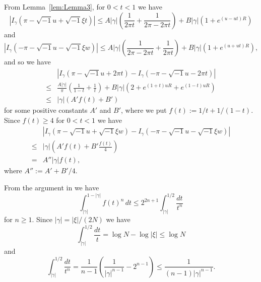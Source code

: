 \documentclass[a4paper]{amsart}
\theoremstyle{plain}
\theoremstyle{definition}
\theoremstyle{remark}
\numberwithin{equation}{section}
\begin{document}
From Lemma~\ref{lem:Lemma3}, for $0<t<1$ we have
\begin{equation*}
  \left|
    I_{\gamma}(\pi-\sqrt{-1}u+\sqrt{-1}\xi t)
  \right|
  \le
  A|\gamma|
  \left(
    \frac{1}{2\pi t}+\frac{1}{2\pi-2\pi t}
  \right)
  +
  B|\gamma|
  \left(
    1+e^{(u-ut)R}
  \right)
\end{equation*}
and
\begin{equation*}
  \left|
    I_{\gamma}(-\pi-\sqrt{-1}u-\sqrt{-1}\xi w)
  \right|
  \le
  A|\gamma|
  \left(
    \frac{1}{2\pi-2\pi t}+\frac{1}{2\pi t}
  \right)
  +
  B|\gamma|
  \left(
    1+e^{(u+ut)R}
  \right),
\end{equation*}
and so we have
\begin{equation*}
\begin{split}
  &\left|
    I_{\gamma}(\pi-\sqrt{-1}u+2\pi t)
    -
    I_{\gamma}(-\pi-\sqrt{-1}u-2\pi t)
  \right|
  \\
  \le&
  \frac{A|\gamma|}{\pi}
  \left(
    \frac{1}{1-t}+\frac{1}{t}
  \right)
  +
  B|\gamma|
  \left(
    2+e^{(1+t)uR}+e^{(1-t)uR}
  \right)
  \\
  \le&
  |\gamma|\left(A'f(t)+B'\right)
\end{split}
\end{equation*}
for some positive constants $A'$ and $B'$, where we put $f(t):=1/t+1/(1-t)$.
Since $f(t)\ge4$ for $0<t<1$ we have
\begin{equation}\label{eq:I_gamma}
\begin{split}
  &\left|
    I_{\gamma}(\pi-\sqrt{-1}u+\sqrt{-1}\xi w)
    -
    I_{\gamma}(-\pi-\sqrt{-1}u-\sqrt{-1}\xi w)
  \right|
  \\
  \le&
  |\gamma|\left(A'f(t)+B'\frac{f(t)}{4}\right)
  \\
  =&
  A''|\gamma|f(t),
\end{split}
\end{equation}
where $A'':=A'+B'/4$.
\par
From the argument in \cite[P.~537]{Andersen/Hansen:JKNOT2006} we have
\begin{equation*}
  \int_{|\gamma|}^{1-|\gamma|}f(t)^n\,dt
  \le
  2^{2n+1}\int_{|\gamma|}^{1/2}\frac{dt}{t^n}
\end{equation*}
for $n\ge1$.
Since $|\gamma|=|\xi|/(2N)$ we have
\begin{equation*}
  \int_{|\gamma|}^{1/2}\frac{dt}{t}
  =
  \log{N}-\log|\xi|
  \le
  \log{N}
\end{equation*}
and
\begin{equation*}
  \int_{|\gamma|}^{1/2}\frac{dt}{t^n}
  =
  \frac{1}{n-1}
  \left(
    \frac{1}{|\gamma|^{n-1}}-2^{n-1}
  \right)
  \le
  \frac{1}{(n-1)|\gamma|^{n-1}}.
\end{equation*}
\end{document}
